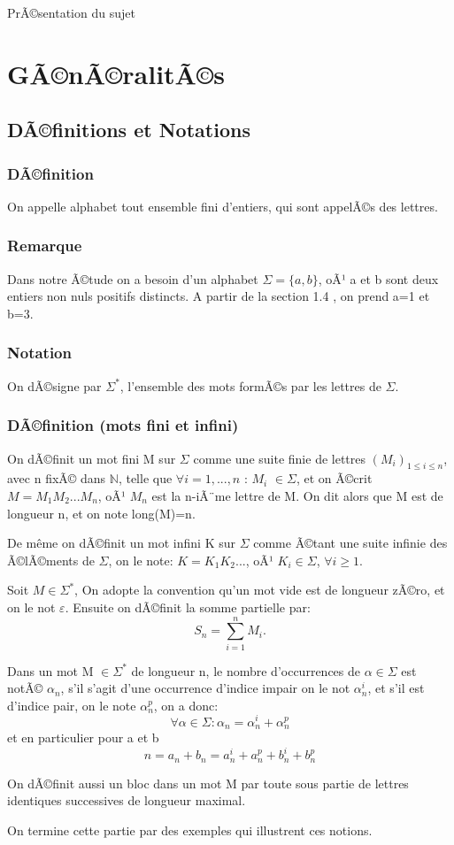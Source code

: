 \documentclass[12pt,a4paper,oneside]{book}
\begin{document}
\begin{titlepage}
\begin{chapter}{PrÃ©sentation du sujet}
\section{GÃ©nÃ©ralitÃ©s}
\subsection{DÃ©finitions et Notations}
\subsubsection*{DÃ©finition}
On appelle alphabet tout ensemble fini d'entiers, qui sont appelÃ©s des lettres.
\subsubsection*{Remarque}
Dans notre Ã©tude on a besoin d'un alphabet \(\Sigma=\{a,b\}\), oÃ¹ a et b sont deux entiers non nuls positifs distincts. A partir de la section 1.4 , on prend a=1 et b=3.
\subsubsection*{Notation}
On dÃ©signe par  \(\Sigma^*\), l'ensemble des mots formÃ©s par les lettres de $\Sigma$. 
\subsubsection*{DÃ©finition (mots fini et infini)}
On dÃ©finit un mot fini M sur $\Sigma$ comme une suite finie de lettres $(M_i)_{1\leq i\leq n}$, avec n fixÃ© dans $ \mathbb{N}$, telle que $\forall i=1,...,n$ : $M_i$ $\in\Sigma$, et on Ã©crit $M=M_1M_2...M_n$, oÃ¹ $M_n$ est la n-iÃ¨me lettre de M. On dit alors que M est de longueur n, et on note long(M)=n.
\par De m\^eme on dÃ©finit un mot infini K sur $\Sigma$ comme Ã©tant une suite infinie des Ã©lÃ©ments de $\Sigma$, on le note: $K=K_1K_2...$, oÃ¹ $K_i \in \Sigma$, $\forall i\geq 1.$\\
\par Soit $M \in \Sigma^*$, On adopte la convention qu'un mot vide est de longueur zÃ©ro, et on le not $\varepsilon$. Ensuite on dÃ©finit la somme partielle par: $$S_n=\sum_{i=1}^nM_i.$$
\par Dans un mot M $\in \Sigma^*$ de longueur n, le nombre d'occurrences de $\alpha \in \Sigma$ est notÃ© $\alpha_n$, s'il s'agit d'une occurrence d'indice impair on le not $\alpha_n^i$, et s'il est d'indice pair, on le note $\alpha_n^p $, on a donc:
$$\forall \alpha \in \Sigma : \alpha_n = \alpha_n^i + \alpha_n^p$$ 
et en particulier pour a et b
$$n= a_n + b_n = a_n^i + a_n^p + b_n^i + b_n^p$$ 
\par On dÃ©finit aussi un bloc dans un mot M par toute sous partie de lettres identiques successives de longueur maximal.\\
\par On termine cette partie par des exemples qui illustrent ces notions.

\end{chapter}
\end{titlepage}
\end{document}
